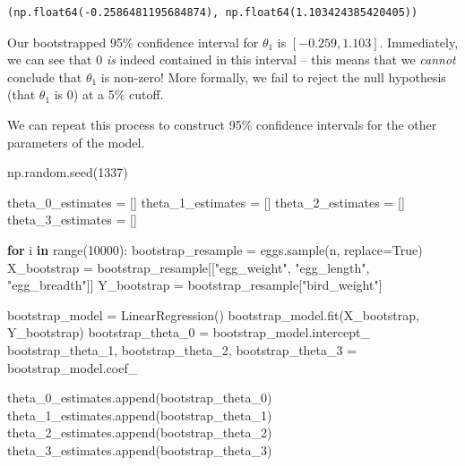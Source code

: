 \documentclass[
  letterpaper,
  DIV=11,
  numbers=noendperiod]{scrreprt}
\newenvironment{Shaded}{\begin{snugshade}}{\end{snugshade}}
\newcommand{\BuiltInTok}[1]{\textcolor[rgb]{0.00,0.23,0.31}{#1}}
\newcommand{\ControlFlowTok}[1]{\textcolor[rgb]{0.00,0.23,0.31}{\textbf{#1}}}
\newcommand{\DecValTok}[1]{\textcolor[rgb]{0.68,0.00,0.00}{#1}}
\newcommand{\KeywordTok}[1]{\textcolor[rgb]{0.00,0.23,0.31}{\textbf{#1}}}
\newcommand{\NormalTok}[1]{\textcolor[rgb]{0.00,0.23,0.31}{#1}}
\newcommand{\OperatorTok}[1]{\textcolor[rgb]{0.37,0.37,0.37}{#1}}
\newcommand{\StringTok}[1]{\textcolor[rgb]{0.13,0.47,0.30}{#1}}
\newcommand{\VariableTok}[1]{\textcolor[rgb]{0.07,0.07,0.07}{#1}}
\begin{document}
\begin{verbatim}
(np.float64(-0.2586481195684874), np.float64(1.103424385420405))
\end{verbatim}

Our bootstrapped 95\% confidence interval for \(\theta_1\) is
\([-0.259, 1.103]\). Immediately, we can see that 0 \emph{is} indeed
contained in this interval -- this means that we \emph{cannot} conclude
that \(\theta_1\) is non-zero! More formally, we fail to reject the null
hypothesis (that \(\theta_1\) is 0) at a 5\% cutoff.

We can repeat this process to construct 95\% confidence intervals for
the other parameters of the model.

\begin{Shaded}
\begin{Highlighting}[]
\NormalTok{np.random.seed(}\DecValTok{1337}\NormalTok{)}

\NormalTok{theta\_0\_estimates }\OperatorTok{=}\NormalTok{ []}
\NormalTok{theta\_1\_estimates }\OperatorTok{=}\NormalTok{ []}
\NormalTok{theta\_2\_estimates }\OperatorTok{=}\NormalTok{ []}
\NormalTok{theta\_3\_estimates }\OperatorTok{=}\NormalTok{ []}


\ControlFlowTok{for}\NormalTok{ i }\KeywordTok{in} \BuiltInTok{range}\NormalTok{(}\DecValTok{10000}\NormalTok{):}
\NormalTok{    bootstrap\_resample }\OperatorTok{=}\NormalTok{ eggs.sample(n, replace}\OperatorTok{=}\VariableTok{True}\NormalTok{)}
\NormalTok{    X\_bootstrap }\OperatorTok{=}\NormalTok{ bootstrap\_resample[[}\StringTok{"egg\_weight"}\NormalTok{, }\StringTok{"egg\_length"}\NormalTok{, }\StringTok{"egg\_breadth"}\NormalTok{]]}
\NormalTok{    Y\_bootstrap }\OperatorTok{=}\NormalTok{ bootstrap\_resample[}\StringTok{"bird\_weight"}\NormalTok{]}
    
\NormalTok{    bootstrap\_model }\OperatorTok{=}\NormalTok{ LinearRegression()}
\NormalTok{    bootstrap\_model.fit(X\_bootstrap, Y\_bootstrap)}
\NormalTok{    bootstrap\_theta\_0 }\OperatorTok{=}\NormalTok{ bootstrap\_model.intercept\_}
\NormalTok{    bootstrap\_theta\_1, bootstrap\_theta\_2, bootstrap\_theta\_3 }\OperatorTok{=}\NormalTok{ bootstrap\_model.coef\_}
    
\NormalTok{    theta\_0\_estimates.append(bootstrap\_theta\_0)}
\NormalTok{    theta\_1\_estimates.append(bootstrap\_theta\_1)}
\NormalTok{    theta\_2\_estimates.append(bootstrap\_theta\_2)}
\NormalTok{    theta\_3\_estimates.append(bootstrap\_theta\_3)}
    

\end{Highlighting}
\end{Shaded}
\end{document}
